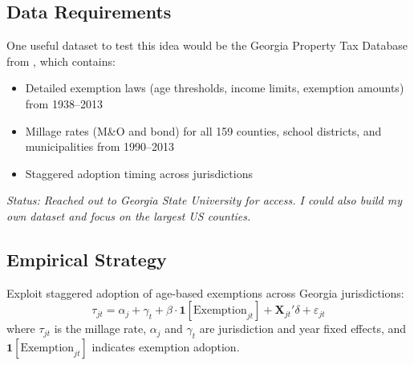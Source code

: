 \documentclass[11pt]{article}
\begin{document}
\subsection{Data Requirements}
One useful dataset to test this idea would be the Georgia Property Tax Database from \citet{banzhaf2021age}, which contains:
\begin{itemize}
    \item Detailed exemption laws (age thresholds, income limits, exemption amounts) from 1938--2013
    \item Millage rates (M\&O and bond) for all 159 counties, school districts, and municipalities from 1990--2013
    \item Staggered adoption timing across jurisdictions
\end{itemize}


\textit{Status: Reached out to Georgia State University for access. I could also build my own dataset and focus on the largest US counties.  }



\subsection{Empirical Strategy}
Exploit staggered adoption of age-based exemptions across Georgia jurisdictions:
\begin{equation}
    \tau_{jt} = \alpha_j + \gamma_t + \beta \cdot \mathbf{1}[\text{Exemption}_{jt}] + \mathbf{X}_{jt}'\delta + \varepsilon_{jt}
\end{equation}
where $\tau_{jt}$ is the millage rate, $\alpha_j$ and $\gamma_t$ are jurisdiction and year fixed effects, and $\mathbf{1}[\text{Exemption}_{jt}]$ indicates exemption adoption.





\appendix








\end{document}
